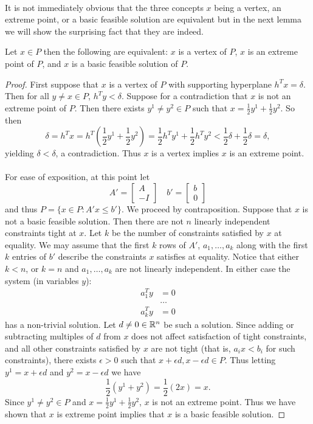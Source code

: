 \paragraph{} It is not immediately obvious that the three concepts $x$ being a vertex, an extreme point, or a basic feasible solution are equivalent but in the next lemma we will show the surprising fact that they are indeed.
\begin{lemma} \label{lemma:bfs-equiv}Let $x \in P$ then the following are equivalent: $x$ is a vertex of $P$, $x$ is an extreme point of $P$, and $x$ is a basic feasible solution of $P$.
\end{lemma}
\begin{proof}
First suppose that $x$ is a vertex of $P$ with supporting hyperplane $h^T x = \delta$. Then for all $y \neq x \in P$, $h^Ty < \delta$. Suppose for a contradiction that $x$ is not an extreme point of $P$. Then there exists $y^1 \neq y^2 \in P$ such that $x = \frac{1}{2}y^1 + \frac{1}{2} y^2$. So then $$\delta = h^T x = h^T(\frac{1}{2} y^1 + \frac{1}{2} y^2) = \frac{1}{2}h^Ty^1 + \frac{1}{2} h^Ty^2 < \frac{1}{2}\delta + \frac{1}{2} \delta = \delta,$$ yielding $\delta < \delta$, a contradiction. Thus $x$ is a vertex implies $x$ is an extreme point.
\paragraph{}
For ease of exposition, at this point let $$A' = \begin{bmatrix} A \\ -I \end{bmatrix} \quad b' = \begin{bmatrix} b \\ 0 \end{bmatrix}$$ and thus $P = \{x\in P : A'x \leq b'\}$. We proceed by contraposition. Suppose that $x$ is not a basic feasible solution. Then there are not $n$ linearly independent constraints tight at $x$. Let $k$ be the number of constraints satisfied by $x$ at equality. We may assume that the first $k$ rows of $A'$, $a_1, \dots, a_k$ along with the first $k$ entries of $b'$ describe the constraints $x$ satisfies at equality. Notice that either $k<n$, or $k=n$ and $a_1, \dots, a_k$ are not linearly independent. In either case the system (in variables $y$):
\begin{align*}
a_1^T y &= 0 \\
&\dots \\
a_k^T y &= 0
\end{align*}
has a non-trivial solution. Let $d \neq 0 \in \mathbb{R}^n$ be such a solution. Since adding or subtracting multiples of $d$ from $x$ does not affect satisfaction of tight constraints, and all other constraints satisfied by $x$ are not tight (that is, $a_i x < b_i$ for such constraints), there exists $\epsilon > 0$ such that $x+ \epsilon d, x-\epsilon d \in P$. Thus letting $y^1 = x+ \epsilon d$ and $y^2 = x-\epsilon d$ we have
$$\frac{1}{2}(y^1 + y^2) = \frac{1}{2}(2x) = x.$$
Since $y^1 \neq y^2 \in P$ and $x = \frac{1}{2}y^1 + \frac{1}{2}y^2$, $x$ is not an extreme point. Thus we have shown that $x$ is extreme point implies that $x$ is a basic feasible solution.

\end{proof}
